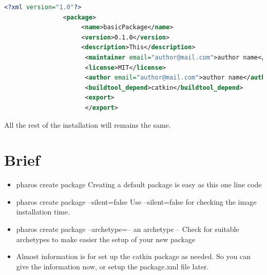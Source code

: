 \documentclass[a4paper,10pt,twoside]{book}
\begin{document}
				\begin{lstlisting}[language=xml,title={ package.xml }]
				<?xml version="1.0"?>
				<package>
 					 <name>basicPackage</name>
					 <version>0.1.0</version>
					 <description>This</description>
					  <maintainer email="author@mail.com">author name</maintainer>
					  <license>MIT</license>
					  <author email="author@mail.com">author name</author> 
					  <buildtool_depend>catkin</buildtool_depend>
					  <export>
					  </export>
				\end{lstlisting} 
				
				
				
				All the rest of the installation will remains the same.
				
				
				
				\section {Brief}


					\begin{itemize}
						\item pharos create package
						\newline \-\-Creating a default package is easy as this one line code
						\item pharos create package --silent=false
						\newline \-\-Use --silent=false for checking the image installation time.
						\item pharos create package --archetype=-- an archetype --
						\newline \-\-Check for suitable archetypes to make easier the setup of your new package
						\item Almost information is for set up the catkin package as needed. So you can give the information now, or setup the package.xml file later.
					\end {itemize}
					


\ifx\wholebook\relax\else
\end{document}
